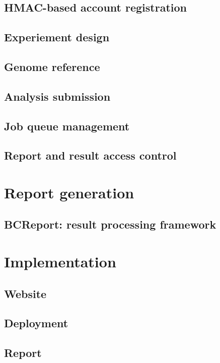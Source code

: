 \subsection{HMAC-based account registration}

\subsection{Experiement design}

\subsection{Genome reference}

\subsection{Analysis submission}

\subsection{Job queue management}

\subsection{Report and result access control}



\section{Report generation}

\subsection{BCReport: result processing framework}



\section{Implementation}

\subsection{Website}

\subsection{Deployment}

\subsection{Report}
